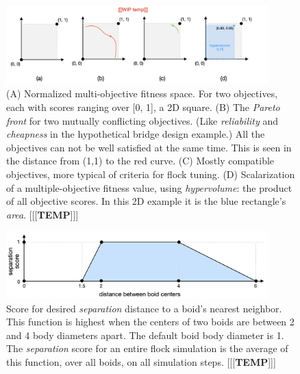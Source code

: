 \documentclass[letterpaper]{article}
\begin{document}


\begin{figure}[t]
    \centering
    \includegraphics[width=0.9\textwidth]{images/temp_MOF_HV.png}
    \caption{(A) Normalized multi-objective fitness space. For two objectives, each with scores ranging over [0, 1], a 2D square. (B) The \textit{Pareto front} for two mutually conflicting objectives. (Like \textit{reliability} and \textit{cheapness} in the hypothetical bridge design example.) All the objectives can not be well satisfied at the same time. This is seen in the distance from (1,1) to the red curve. (C) Mostly compatible objectives, more typical of criteria for flock tuning. (D) Scalarization of a multiple-objective fitness value, using \textit{hypervolume}: the product of all objective scores. In this 2D example it is the blue rectangle's \textit{area}. [[[\textbf{TEMP}]]]}
    \label{fig:MOF_HV}
\end{figure}

\begin{figure}[t]
    \centering
    \includegraphics[width=0.9\textwidth]{images/temp_sep_score.png}
    \caption{Score for desired \textit{separation} distance to a boid's nearest neighbor. This function is highest when the centers of two boids are between 2 and 4 body diameters apart. The default boid body diameter is 1. The \textit{separation} score for an entire flock simulation is the average of this function, over all boids, on all simulation steps. [[[\textbf{TEMP}]]]}
    \label{fig:separation_score}
\end{figure}
\end{document}
